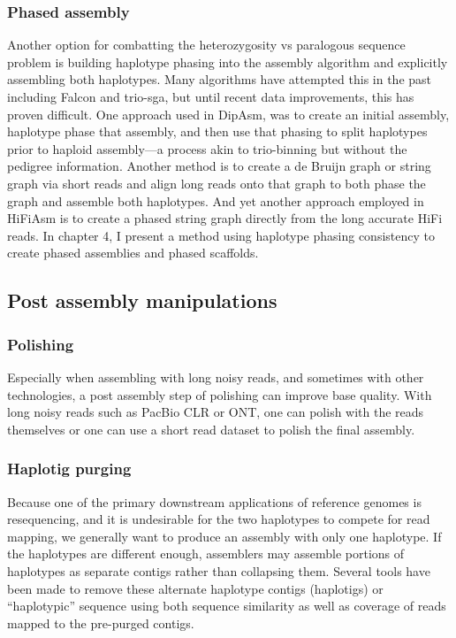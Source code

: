 \subsubsection{Phased assembly}

\par{
Another option for combatting the heterozygosity vs paralogous sequence problem is building haplotype phasing into the assembly algorithm and explicitly assembling both haplotypes. Many algorithms have attempted this in the past including Falcon\cite{falcon} and trio-sga\cite{trio-sga}, but until recent data improvements, this has proven difficult. One approach used in DipAsm, was to create an initial assembly, haplotype phase that assembly, and then use that phasing to split haplotypes prior to haploid assembly---a process akin to trio-binning but without the pedigree information\cite{dipasm}. Another method is to create a de Bruijn graph or string graph via short reads and align long reads onto that graph to both phase the graph and assemble both haplotypes\cite{Garg2018}. And yet another approach employed in HiFiAsm is to create a phased string graph directly from the long accurate HiFi reads\cite{hifiasm}. In chapter 4, I present a method using haplotype phasing consistency to create phased assemblies and phased scaffolds.
}

\subsection{Post assembly manipulations}
\subsubsection{Polishing}
\par{
Especially when assembling with long noisy reads, and sometimes with other technologies, a post assembly step of polishing can improve base quality. With long noisy reads such as PacBio CLR or ONT, one can polish with the reads themselves\cite{arrow}\cite{nanopolish} or one can use a short read dataset to polish the final assembly\cite{pilon}.
}
\subsubsection{Haplotig purging}

\par{
Because one of the primary downstream applications of reference genomes is resequencing, and it is undesirable for the two haplotypes to compete for read mapping, we generally want to produce an assembly with only one haplotype. If the haplotypes are different enough, assemblers may assemble portions of haplotypes as separate contigs rather than collapsing them. Several tools have been made to remove these  alternate haplotype contigs (haplotigs) or ``haplotypic'' sequence using both sequence similarity as well as coverage of reads mapped to the pre-purged contigs\cite{haplomerger}\cite{purge}\cite{purgedups}.
}
